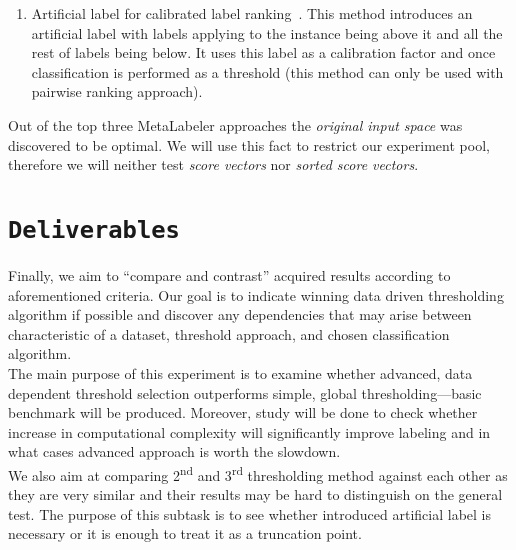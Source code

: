 \documentclass[12pt,a4paper,twocolumn]{article}
\newcommand{\ts}{\textsuperscript}
\begin{document}
\begin{enumerate}
\item Artificial label for calibrated label ranking~\cite{DBLP:conf/ecml/ParkF07}. This method introduces an artificial label with labels applying to the instance being above it and all the rest of labels being below. It uses this label as a calibration factor and once classification is performed as a threshold (this method can only be used with pairwise ranking approach).

\end{enumerate}

Out of the top three MetaLabeler approaches the \emph{original input space} was discovered to be optimal. We will use this fact to restrict our experiment pool, therefore we will neither test \emph{score vectors} nor \emph{sorted score vectors}.\\



\section*{\texttt{Deliverables}}
Finally, we aim to ``compare and contrast'' acquired results according to aforementioned criteria. Our goal is to indicate winning data driven thresholding algorithm if possible and discover any dependencies that may arise between characteristic of a dataset, threshold approach, and chosen classification algorithm.\\

The main purpose of this experiment is to examine whether advanced, data dependent threshold selection outperforms simple, global thresholding---basic benchmark will be produced. Moreover, study will be done to check whether increase in computational complexity will significantly improve labeling and in what cases advanced approach is worth the slowdown.\\

We also aim at comparing 2\ts{nd} and 3\ts{rd} thresholding method against each other as they are very similar and their results may be hard to distinguish on the general test. The purpose of this subtask is to see whether introduced artificial label is necessary or it is enough to treat it as a truncation point.\\


{}


\end{document}
